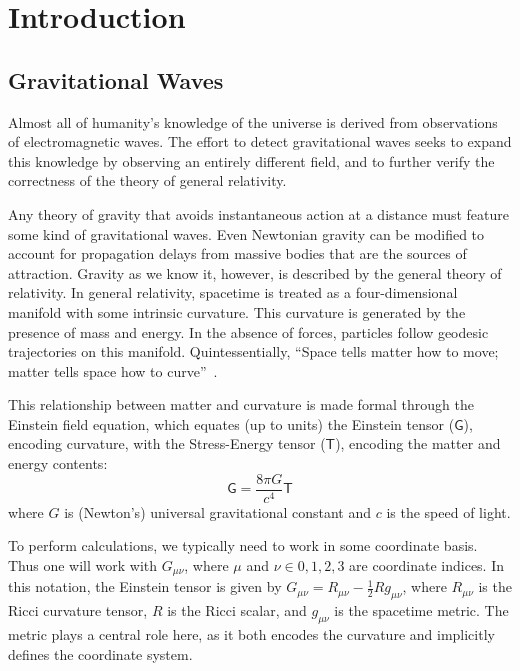 \chapter{Introduction}
\label{chapter1}

\section{Gravitational Waves}

Almost all of humanity's knowledge of the universe is derived from
observations of electromagnetic waves.  The effort to detect
gravitational waves seeks to expand this knowledge by observing an
entirely different field, and to further verify the correctness of the
theory of general relativity.

Any theory of gravity that avoids instantaneous action at a distance
must feature some kind of gravitational waves.  Even Newtonian gravity
can be modified to account for propagation delays from massive bodies
that are the sources of attraction\cite{Schutz1984Gravitational}.
Gravity as we know it, however, is described by the general theory of
relativity.  In general relativity, spacetime is treated as a
four-dimensional manifold with some intrinsic curvature.  This
curvature is generated by the presence of mass and energy.  In the
absence of forces, particles follow geodesic trajectories on this
manifold.  Quintessentially, ``Space tells matter how to move; matter
tells space how to curve''~\cite{MTW}.

This relationship between matter and curvature is made formal through
the Einstein field equation, which equates (up to units) the Einstein
tensor ($\mathsf{G}$), encoding curvature, with the
Stress-Energy tensor ($\mathsf{T}$), encoding the matter and energy
contents:
\begin{equation}
\mathsf{G} = \frac {8\pi G}{c^4} \mathsf{T}
\end{equation}
where $G$ is (Newton's) universal gravitational constant and $c$ is
the speed of light.

To perform calculations, we typically need to work in some coordinate
basis.  Thus one will work with $G_{\mu\nu}$, where $\mu$ and $\nu \in
{0,1,2,3}$ are coordinate indices.  In this notation, the Einstein
tensor is given by $G_{\mu\nu} = R_{\mu\nu} - \frac{1}{2} R
g_{\mu\nu}$, where $R_{\mu\nu}$ is the Ricci curvature tensor, $R$ is
the Ricci scalar, and $g_{\mu\nu}$ is the spacetime metric.  The
metric plays a central role here, as it both encodes the curvature and
implicitly defines the coordinate system.

